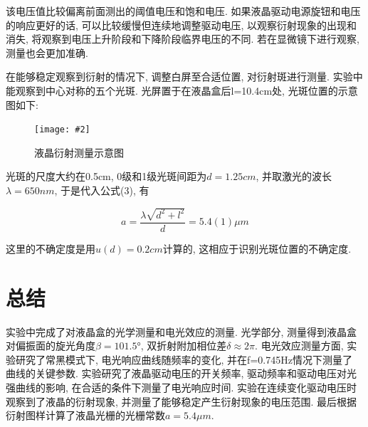 \documentclass[12pt,a4paper]{article}
\newcommand{\be}[1]{
    \begin{equation}
        #1
    \end{equation}
}
\newcommand{\bfig}[3]{
    \begin{figure}[H]
        \centering
        \texttt{[image: \#2]}
        \caption{#3}
    \end{figure}
}
\begin{document}
该电压值比较偏离前面测出的阈值电压和饱和电压. 如果液晶驱动电源旋钮和电压的响应更好的话, 可以比较缓慢但连续地调整驱动电压, 以观察衍射现象的出现和消失, 将观察到电压上升阶段和下降阶段临界电压的不同. 若在显微镜下进行观察, 测量也会更加准确. 

在能够稳定观察到衍射的情况下, 调整白屏至合适位置, 对衍射斑进行测量. 实验中能观察到中心对称的五个光斑. 光屏置于在液晶盒后l=10.4cm处, 光斑位置的示意图如下: 
\bfig{0.5}{液晶衍射示意图.jpg}{液晶衍射测量示意图}
光斑的尺度大约在0.5cm, 0级和1级光斑间距为$d=1.25cm$, 并取激光的波长$\lambda=650nm$, 于是代入公式(3), 有
\be{a=\frac{\lambda \sqrt{d^2+l^2}}{d}=5.4(1)\mu m}
这里的不确定度是用$u(d)=0.2cm$计算的, 这相应于识别光斑位置的不确定度. 
\section{总结}
实验中完成了对液晶盒的光学测量和电光效应的测量. 光学部分, 测量得到液晶盒对偏振面的旋光角度$\beta=101.5°$, 双折射附加相位差$\delta \approx 2\pi$. 电光效应测量方面, 实验研究了常黑模式下, 电光响应曲线随频率的变化, 并在f=0.745Hz情况下测量了
曲线的关键参数. 实验研究了液晶驱动电压的开关频率, 驱动频率和驱动电压对光强曲线的影响, 在合适的条件下测量了电光响应时间. 实验在连续变化驱动电压时观察到了液晶的衍射现象, 并测量了能够稳定产生衍射现象的电压范围. 最后根据衍射图样计算了液晶光栅的光栅常数$a=5.4\mu m$. 
\end{document}
